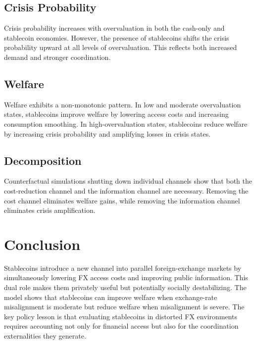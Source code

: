 \documentclass[12pt]{article}
\begin{document}
\subsection{Crisis Probability}

Crisis probability increases with overvaluation in both the cash-only and stablecoin economies. However, the presence of stablecoins shifts the crisis probability upward at all levels of overvaluation. This reflects both increased demand and stronger coordination.

\subsection{Welfare}

Welfare exhibits a non-monotonic pattern. In low and moderate overvaluation states, stablecoins improve welfare by lowering access costs and increasing consumption smoothing. In high-overvaluation states, stablecoins reduce welfare by increasing crisis probability and amplifying losses in crisis states.

\subsection{Decomposition}

Counterfactual simulations shutting down individual channels show that both the cost-reduction channel and the information channel are necessary. Removing the cost channel eliminates welfare gains, while removing the information channel eliminates crisis amplification.

\section{Conclusion}

Stablecoins introduce a new channel into parallel foreign-exchange markets by simultaneously lowering FX access costs and improving public information. This dual role makes them privately useful but potentially socially destabilizing. The model shows that stablecoins can improve welfare when exchange-rate misalignment is moderate but reduce welfare when misalignment is severe. The key policy lesson is that evaluating stablecoins in distorted FX environments requires accounting not only for financial access but also for the coordination externalities they generate.
\end{document}
